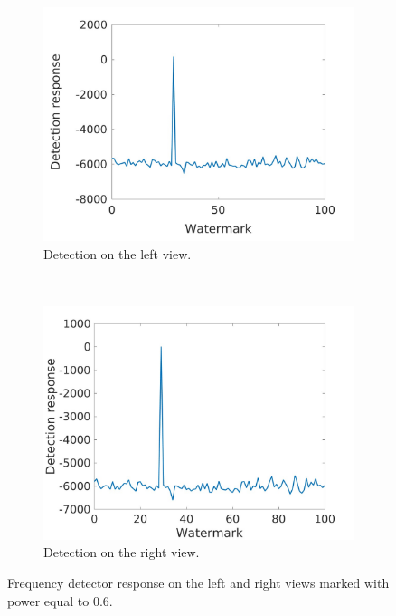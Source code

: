 \begin{figure}[h!]
    \centering
    \begin{subfigure}[t]{0.5\textwidth}
        \centering
\includegraphics[width=1\textwidth]{./img/likelihood/correct_LikelihoodL_06.jpg}
          \caption{\small{Detection on the left view.}}
\label{fig:Ll06}

    \end{subfigure}%
    ~ 
    \begin{subfigure}[t]{0.5\textwidth}
        \centering
\includegraphics[width=1\textwidth]{./img/likelihood/correct_LikelihoodLr_06.jpg}
           \caption{\small{Detection on the right view.}}
\label{fig:Lr06}
    \end{subfigure}
    \caption{Frequency detector response on the left and right views marked with power equal to 0.6.}
     \label{fig:Ll}
\end{figure}


